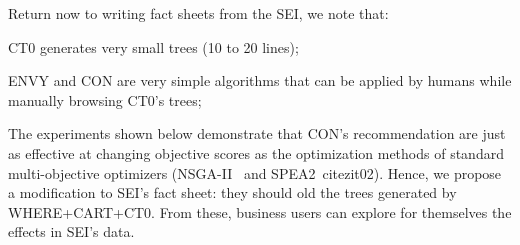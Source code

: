 Return now to writing fact sheets from the SEI, we note that:
\bi
\item
CT0 generates very small trees (10 to 20 lines);
\item
ENVY and CON are very simple algorithms
that can be applied by humans while manually browsing CT0's trees;
\item
The experiments shown below demonstrate that CON's recommendation are just as effective
at changing objective scores as 
the optimization methods of standard multi-objective optimizers 
(NSGA-II~\cite{deb00a} and SPEA2~cite{zit02}).
\ei
Hence, we propose a modification to SEI's fact sheet:
they should old the trees
generated by WHERE+CART+CT0. From these, 
business users can explore for themselves the effects in SEI's data.


